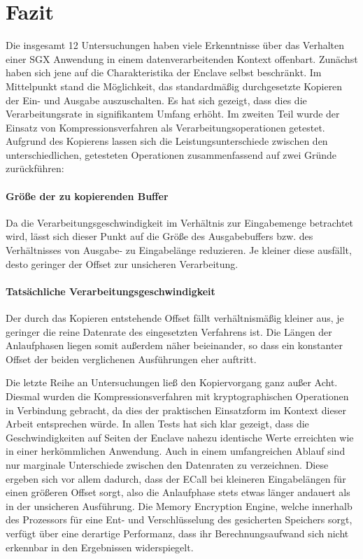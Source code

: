 \section{Fazit}

Die insgesamt 12 Untersuchungen haben viele Erkenntnisse über das Verhalten einer \ac{SGX} Anwendung in einem datenverarbeitenden Kontext offenbart. Zunächst haben sich jene auf die Charakteristika der Enclave selbst beschränkt. Im Mittelpunkt stand die Möglichkeit, das standardmäßig durchgesetzte Kopieren der Ein- und Ausgabe auszuschalten. Es hat sich gezeigt, dass dies die Verarbeitungsrate in signifikantem Umfang erhöht. Im zweiten Teil wurde der Einsatz von Kompressionsverfahren als Verarbeitungsoperationen getestet. Aufgrund des Kopierens lassen sich die Leistungsunterschiede zwischen den unterschiedlichen, getesteten Operationen zusammenfassend auf zwei Gründe zurückführen:

\paragraph{Größe der zu kopierenden Buffer}
Da die Verarbeitungsgeschwindigkeit im Verhältnis zur Eingabemenge betrachtet wird, lässt sich dieser Punkt auf die Größe des Ausgabebuffers bzw. des Verhältnisses von Ausgabe- zu Eingabelänge reduzieren. Je kleiner diese ausfällt, desto geringer der Offset zur unsicheren Verarbeitung.

\paragraph{Tatsächliche Verarbeitungsgeschwindigkeit}
Der durch das Kopieren entstehende Offset fällt verhältnismäßig kleiner aus, je geringer die reine Datenrate des eingesetzten Verfahrens ist. Die Längen der Anlaufphasen liegen somit außerdem näher beieinander, so dass ein konstanter Offset der beiden verglichenen Ausführungen eher auftritt.

Die letzte Reihe an Untersuchungen ließ den Kopiervorgang ganz außer Acht. Diesmal wurden die Kompressionsverfahren mit kryptographischen Operationen in Verbindung gebracht, da dies der praktischen Einsatzform im Kontext dieser Arbeit entsprechen würde. In allen Tests hat sich klar gezeigt, dass die Geschwindigkeiten auf Seiten der Enclave nahezu identische Werte erreichten wie in einer herkömmlichen Anwendung. Auch in einem umfangreichen Ablauf sind nur marginale Unterschiede zwischen den Datenraten zu verzeichnen. Diese ergeben sich vor allem dadurch, dass der \ac{ECall} bei kleineren Eingabelängen für einen größeren Offset sorgt, also die Anlaufphase stets etwas länger andauert als in der unsicheren Ausführung. Die Memory Encryption Engine, welche innerhalb des Prozessors für eine Ent- und Verschlüsselung des gesicherten Speichers sorgt, verfügt über eine derartige Performanz, dass ihr Berechnungsaufwand sich nicht erkennbar in den Ergebnissen widerspiegelt.

